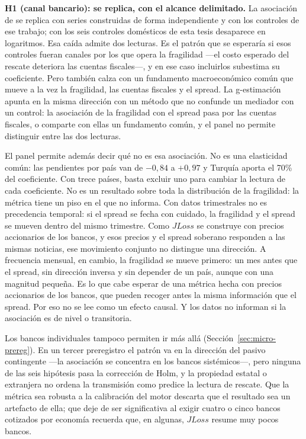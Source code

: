 \textbf{H1 (canal bancario): se replica, con el alcance delimitado.} La asociación de \citet{Chari2024b} se replica con series construidas de forma independiente y con los controles de ese trabajo; con los seis controles domésticos de esta tesis desaparece en logaritmos. Esa caída admite dos lecturas. Es el patrón que se esperaría si esos controles fueran canales por los que opera la fragilidad ---el costo esperado del rescate deteriora las cuentas fiscales---, y en ese caso incluirlos subestima su coeficiente. Pero también calza con un fundamento macroeconómico común que mueve a la vez la fragilidad, las cuentas fiscales y el spread. La g-estimación apunta en la misma dirección con un método que no confunde un mediador con un control: la asociación de la fragilidad con el spread pasa por las cuentas fiscales, o comparte con ellas un fundamento común, y el panel no permite distinguir entre las dos lecturas.

El panel permite además decir qué no es esa asociación. No es una elasticidad común: las pendientes por país van de $-0{,}84$ a $+0{,}97$ y Turquía aporta el 70\% del coeficiente. Con trece países, basta excluir uno para cambiar la lectura de cada coeficiente. No es un resultado sobre toda la distribución de la fragilidad: la métrica tiene un piso en el que no informa. Con datos trimestrales no es precedencia temporal: si el spread se fecha con cuidado, la fragilidad y el spread se mueven dentro del mismo trimestre. Como $JLoss$ se construye con precios accionarios de los bancos, y esos precios y el spread soberano responden a las mismas noticias, ese movimiento conjunto no distingue una dirección. A frecuencia mensual, en cambio, la fragilidad se mueve primero: un mes antes que el spread, sin dirección inversa y sin depender de un país, aunque con una magnitud pequeña. Es lo que cabe esperar de una métrica hecha con precios accionarios de los bancos, que pueden recoger antes la misma información que el spread. Por eso no se lee como un efecto causal. Y los datos no informan si la asociación es de nivel o transitoria.

Los bancos individuales tampoco permiten ir más allá (Sección~\ref{sec:micro-prereg}). En un tercer preregistro el patrón va en la dirección del pasivo contingente ---la asociación se concentra en los bancos sistémicos---, pero ninguna de las seis hipótesis pasa la corrección de Holm, y la propiedad estatal o extranjera no ordena la transmisión como predice la lectura de rescate. Que la métrica sea robusta a la calibración del motor descarta que el resultado sea un artefacto de ella; que deje de ser significativa al exigir cuatro o cinco bancos cotizados por economía recuerda que, en algunas, $JLoss$ resume muy pocos bancos.

